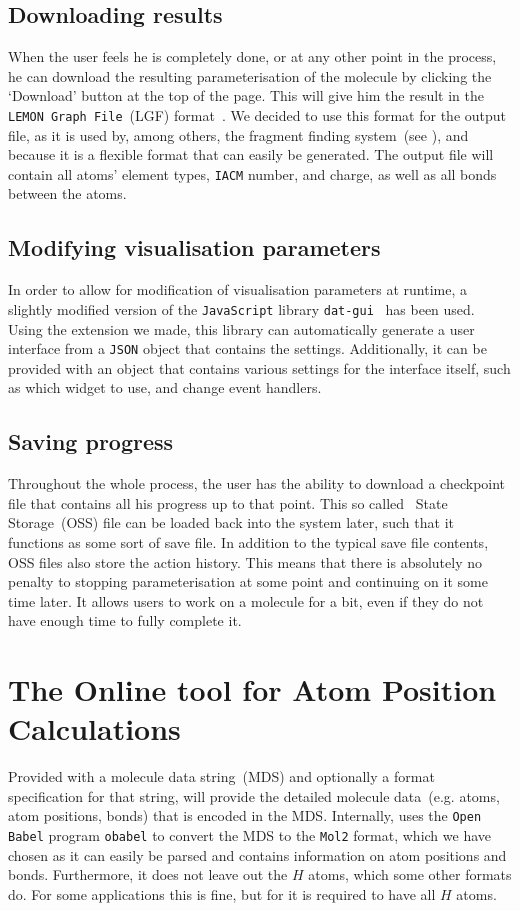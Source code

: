 \subsection{Downloading results}
When the user feels he is completely done, or at any other point in the process, he can download the resulting parameterisation of the molecule by clicking the `Download' button at the top of the page. This will give him the result in the \verb|LEMON Graph File|~(LGF) format~\cite{dezso2011lemon}. We decided to use this format for the output file, as it is used by, among others, the fragment finding system~(see ), and because it is a flexible format that can easily be generated. The output file will contain all atoms' element types, \verb|IACM| number, and charge, as well as all bonds between the atoms.


\subsection{Modifying visualisation parameters}
In order to allow for modification of visualisation parameters at runtime, a slightly modified version of the \verb|JavaScript| library \verb|dat-gui|~\cite{data2011dat} has been used. Using the extension we made, this library can automatically generate a user interface from a \verb|JSON| object that contains the settings. Additionally, it can be provided with an object that contains various settings for the interface itself, such as which widget to use, and change event handlers.

\subsection{Saving progress}
Throughout the whole process, the user has the ability to download a checkpoint file that contains all his progress up to that point. This so called \oframp\ State Storage~(OSS) file can be loaded back into the system later, such that it functions as some sort of save file. In addition to the typical save file contents, OSS files also store the action history. This means that there is absolutely no penalty to stopping parameterisation at some point and continuing on it some time later. It allows users to work on a molecule for a bit, even if they do not have enough time to fully complete it.



\section[\oapoc]{The Online tool for Atom Position Calculations}
Provided with a molecule data string~(MDS) and optionally a format specification for that string, \oapoc{} will provide the detailed molecule data~(e.g. atoms, atom positions, bonds) that is encoded in the MDS. Internally, \oapoc{} uses the \verb|Open Babel| program \verb|obabel| to convert the MDS to the \verb|Mol2| format, which we have chosen as it can easily be parsed and contains information on atom positions and bonds. Furthermore, it does not leave out the $H$ atoms, which some other formats do. For some applications this is fine, but for \oframp{} it is required to have all $H$ atoms.

